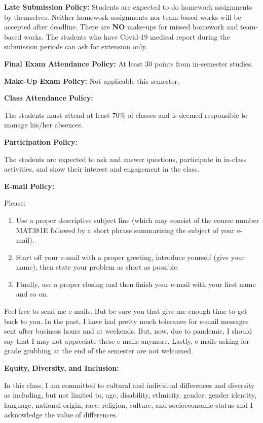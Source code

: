 \documentclass[
  12pt,
]{article}
\providecommand{\tightlist}{%
  \setlength{\itemsep}{0pt}\setlength{\parskip}{0pt}}
\begin{document}
\textbf{Late Submission Policy:} Students are expected to do homework
assignments by themselves. Neither homework assignments nor team-based
works will be accepted after deadline. There are \textbf{NO} make-ups
for missed homework and team-based works. The students who have Covid-19
medical report during the submission periods can ask for extension only.

\textbf{Final Exam Attendance Policy:} At least 30 points from
in-semester studies.

\textbf{Make-Up Exam Policy:} Not applicable this semester.

\textbf{Class Attendance Policy:}

The students must attend at least 70\% of classes and is deemed
responsible to manage his/her absences.

\textbf{Participation Policy:}

The students are expected to ask and answer questions, participate in
in-class activities, and show their interest and engagement in the
class.

\textbf{E-mail Policy:}

Please:

\begin{enumerate}
\def\labelenumi{\arabic{enumi}.}
\tightlist
\item
  Use a proper descriptive subject line (which may consist of the course
  number MAT381E followed by a short phrase summarizing the subject of
  your e-mail).
\item
  Start off your e-mail with a proper greeting, introduce yourself (give
  your name), then state your problem as short as possible.
\item
  Finally, use a proper closing and then finish your e-mail with your
  first name and so on.
\end{enumerate}

Feel free to send me e-mails. But be sure you that give me enough time
to get back to you. In the past, I have had pretty much tolerance for
e-mail messages sent after business hours and at weekends. But, now, due
to pandemic, I should say that I may not appreciate these e-mails
anymore. Lastly, e-mails asking for grade grubbing at the end of the
semester are not welcomed.

\textbf{Equity, Diversity, and Inclusion:}

In this class, I am committed to cultural and individual differences and
diversity as including, but not limited to, age, disability, ethnicity,
gender, gender identity, language, national origin, race, religion,
culture, and socioeconomic status and I acknowledge the value of
differences.
\end{document}

